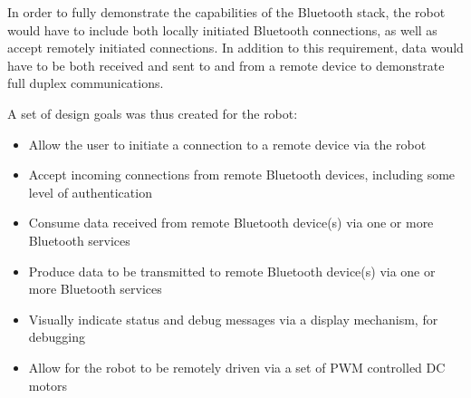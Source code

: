 In order to fully demonstrate the capabilities of the Bluetooth stack, the robot would have to include both locally initiated Bluetooth connections, as well as accept remotely initiated connections. In addition to this requirement, data would have to be both received and sent to and from a remote device to demonstrate full duplex communications.

A set of design goals was thus created for the robot:

\begin{itemize}
	\item Allow the user to initiate a connection to a remote device via the robot
	\item Accept incoming connections from remote Bluetooth devices, including some level of authentication
	\item Consume data received from remote Bluetooth device(s) via one or more Bluetooth services
	\item Produce data to be transmitted to remote Bluetooth device(s) via one or more Bluetooth services
	\item Visually indicate status and debug messages via a display mechanism, for debugging
	\item Allow for the robot to be remotely driven via a set of PWM controlled DC motors
\end{itemize}

